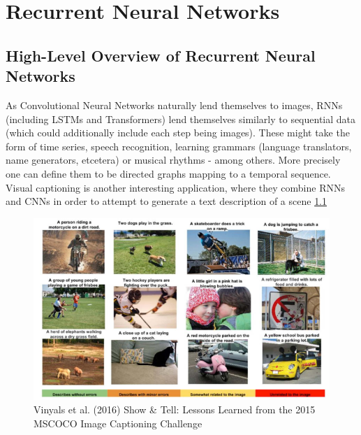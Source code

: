 \chapter{Recurrent Neural Networks}

\section{ High-Level Overview of Recurrent Neural Networks }

As Convolutional Neural Networks naturally lend themselves to images, RNNs (including LSTMs and Transformers) lend themselves similarly to sequential data (which could additionally include each step being images). These might take the form of time series, speech recognition, learning grammars (language translators, name generators, etcetera) or musical rhythms - among others. More precisely one can define them to be directed graphs mapping to a temporal sequence.\\

Visual captioning \cite{DBLP:journals/corr/VinyalsTBE16} is another interesting application, where they combine RNNs and CNNs in order to attempt to generate a text description of a scene \ref{fig:visual_caption}

\begin{figure}
    \centering
    \includegraphics[width=\textwidth]{labs/07/images/image_captioning.png}
    \caption{Vinyals et al. (2016) Show \& Tell: Lessons Learned from the 2015 MSCOCO Image Captioning Challenge}
    \label{fig:visual_caption}
\end{figure}

